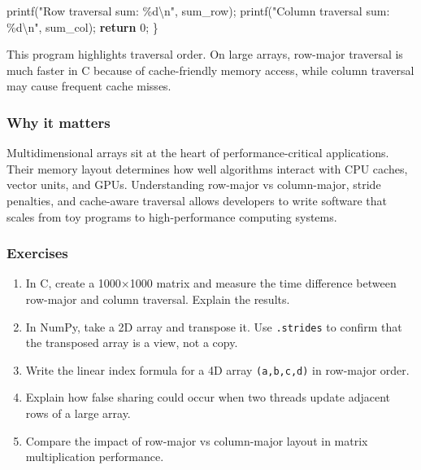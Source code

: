 \documentclass[
  letterpaper,
  DIV=11,
  numbers=noendperiod]{scrreprt}
\newenvironment{Shaded}{\begin{snugshade}}{\end{snugshade}}
\newcommand{\ControlFlowTok}[1]{\textcolor[rgb]{0.00,0.23,0.31}{\textbf{#1}}}
\newcommand{\DecValTok}[1]{\textcolor[rgb]{0.68,0.00,0.00}{#1}}
\newcommand{\NormalTok}[1]{\textcolor[rgb]{0.00,0.23,0.31}{#1}}
\newcommand{\OperatorTok}[1]{\textcolor[rgb]{0.37,0.37,0.37}{#1}}
\newcommand{\SpecialCharTok}[1]{\textcolor[rgb]{0.37,0.37,0.37}{#1}}
\newcommand{\StringTok}[1]{\textcolor[rgb]{0.13,0.47,0.30}{#1}}
\providecommand{\tightlist}{%
  \setlength{\itemsep}{0pt}\setlength{\parskip}{0pt}}
\begin{document}
\begin{Shaded}
\begin{Highlighting}[]
\NormalTok{    printf}\OperatorTok{(}\StringTok{"Row traversal sum: }\SpecialCharTok{\%d\textbackslash{}n}\StringTok{"}\OperatorTok{,}\NormalTok{ sum\_row}\OperatorTok{);}
\NormalTok{    printf}\OperatorTok{(}\StringTok{"Column traversal sum: }\SpecialCharTok{\%d\textbackslash{}n}\StringTok{"}\OperatorTok{,}\NormalTok{ sum\_col}\OperatorTok{);}
    \ControlFlowTok{return} \DecValTok{0}\OperatorTok{;}
\OperatorTok{\}}
\end{Highlighting}
\end{Shaded}

This program highlights traversal order. On large arrays, row-major
traversal is much faster in C because of cache-friendly memory access,
while column traversal may cause frequent cache misses.

\subsubsection{Why it matters}\label{why-it-matters-23}

Multidimensional arrays sit at the heart of performance-critical
applications. Their memory layout determines how well algorithms
interact with CPU caches, vector units, and GPUs. Understanding
row-major vs column-major, stride penalties, and cache-aware traversal
allows developers to write software that scales from toy programs to
high-performance computing systems.

\subsubsection{Exercises}\label{exercises-23}

\begin{enumerate}
\def\labelenumi{\arabic{enumi}.}
\tightlist
\item
  In C, create a 1000×1000 matrix and measure the time difference
  between row-major and column traversal. Explain the results.
\item
  In NumPy, take a 2D array and transpose it. Use \texttt{.strides} to
  confirm that the transposed array is a view, not a copy.
\item
  Write the linear index formula for a 4D array \texttt{(a,b,c,d)} in
  row-major order.
\item
  Explain how false sharing could occur when two threads update adjacent
  rows of a large array.
\item
  Compare the impact of row-major vs column-major layout in matrix
  multiplication performance.
\end{enumerate}
\end{document}
